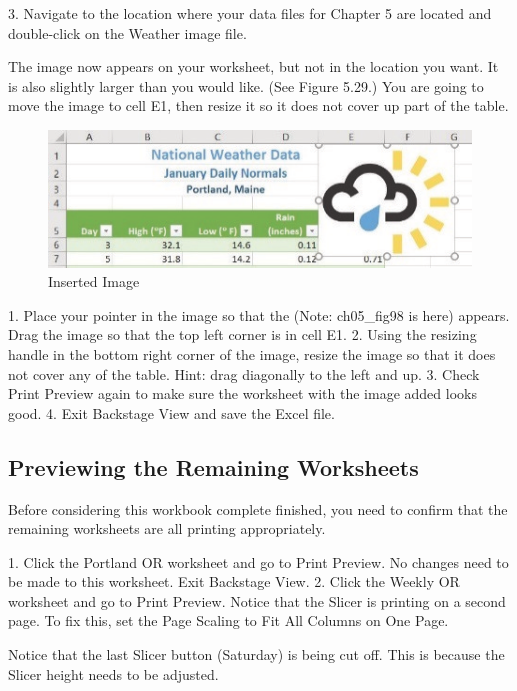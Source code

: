 3. Navigate to the location where your data files for Chapter 5 are located and double-click on the
Weather image file.

The image now appears on your worksheet, but not in the location you want. It is also slightly larger
than you would like. (See Figure 5.29.) You are going to move the image to cell E1, then resize it so it
does not cover up part of the table.


\begin{figure}[H]
	\centering
	\includegraphics[width=\maxwidth{.95\linewidth}]{gfx/ch05_fig29}
	\caption{Inserted Image}
	\label{05:fig29}
\end{figure}





1. Place your pointer in the image so that the  (Note: ch05\_fig98 is here)   appears. Drag the image so that the top left corner
is in cell E1.
2. Using the resizing handle in the bottom right corner of the image, resize the image so that it
does not cover any of the table. Hint: drag diagonally to the left and up.
3. Check Print Preview again to make sure the worksheet with the image added looks good.
4. Exit Backstage View and save the Excel file.

\subsection{Previewing the Remaining Worksheets}

Before considering this workbook complete finished, you need to confirm that the remaining
worksheets are all printing appropriately.

1. Click the Portland OR worksheet and go to Print Preview. No changes need to be made to this
worksheet. Exit Backstage View.
2. Click the Weekly OR worksheet and go to Print Preview. Notice that the Slicer is printing on a
second page. To fix this, set the Page Scaling to Fit All Columns on One Page.

Notice that the last Slicer button (Saturday) is being cut off. This is because the Slicer height needs to
be adjusted.

